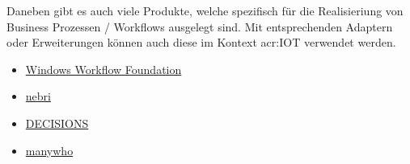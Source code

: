 \newpage
Daneben gibt es auch viele Produkte, welche spezifisch für die Realisieriung von Business Prozessen / Workflows ausgelegt sind. Mit entsprechenden Adaptern oder Erweiterungen können auch diese im Kontext \gls{acr:IOT} verwendet werden.

\begin{itemize}
\item \hyperlink{https://msdn.microsoft.com/en-us/library/jj684582.aspx}{Windows Workflow Foundation}
\item \hyperlink{https://nebrios.com/}{nebri}
\item \hyperlink{http://decisions.com/}{DECISIONS}
\item \hyperlink{https://manywho.com/}{manywho}
\end{itemize}




